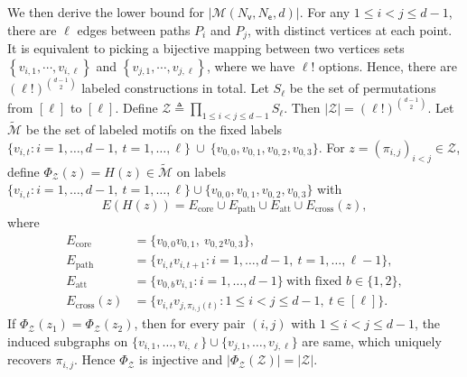 \documentclass[letterpaper,11pt]{article}
\theoremstyle{definition}
\newcommand{\maM}{\mathcal{M}}
\newcommand{\maZ}{\mathcal{Z}}
\newcommand{\nbr}[1]{{\sf\color{red}[#1]}}
\newcommand{\sth}[1]{\left\{ #1 \right\}}
\newcommand{\calX}{{\mathcal{X}}}
\newcommand{\calY}{{\mathcal{Y}}}
\newcommand{\sfM}{{\mathsf{M}}}
\newcommand{\sfe}{{\mathsf{e}}}
\newcommand{\sfv}{{\mathsf{v}}}
\newcommand{\aut}{\mathsf{aut}}
\begin{document}


We then derive the lower bound for $|\maM(N_\sfv,N_\sfe,d)|$. For any $1\le i<j\le d-1$, there are $\ell$ edges between paths $P_i$ and $P_j$, with distinct vertices at each point. It is equivalent to picking a bijective mapping between two vertices sets $\sth{v_{i,1},\cdots, v_{i,\ell}}$ and $\sth{v_{j,1},\cdots, v_{j,\ell}}$, where we have $\ell!$ options. 
Hence, there are $(\ell !)^{\binom{d-1}{2}}$ labeled constructions in total. 
Let $S_{\ell}$ be the set of permutations from $[\ell]$ to $[\ell]$. Define $\mathcal{Z}\triangleq\prod_{1\le i<j\le d-1} S_{\ell}$. Then $|\maZ| =(\ell!)^{\binom{d-1}{2}}$.
Let $\widetilde{\mathcal{M}}$ be the set of labeled motifs on the fixed labels
\(
\{v_{i,t}: i=1,\dots,d-1,\ t=1,\dots,\ell\}\ \cup\ \{v_{0,0},v_{0,1},v_{0,2},v_{0,3}\}.
\)
For $z=(\pi_{i,j})_{i<j}\in\mathcal Z$, define $\Phi_{\mathcal Z}(z)=H(z)\in\widetilde{\mathcal M}$ on labels
$\{v_{i,t}: i=1,\dots,d-1,\ t=1,\dots,\ell\}\cup\{v_{0,0},v_{0,1},v_{0,2},v_{0,3}\}$ with
\[
E(H(z))=E_{\mathrm{core}}\cup E_{\mathrm{path}}\cup E_{\mathrm{att}}\cup E_{\mathrm{cross}}(z),
\]
where
\begin{align*}
    E_{\mathrm{core}}&=\{v_{0,0}v_{0,1},\ v_{0,2}v_{0,3}\},\\
E_{\mathrm{path}}&=\{v_{i,t}v_{i,t+1}: i=1,\dots,d-1,\ t=1,\dots,\ell-1\},\\
E_{\mathrm{att}}&=\{v_{0,b}v_{i,1}: i=1,\dots,d-1\}\ \text{with fixed }b\in\{1,2\},\\
E_{\mathrm{cross}}(z)&=\{v_{i,t}v_{j,\pi_{i,j}(t)}: 1\le i<j\le d-1,\ t\in[\ell]\}.
\end{align*}
If $\Phi_{\mathcal{Z}}(z_1)=\Phi_{\mathcal{Z}}(z_2)$, then for every pair $(i,j)$ with $1\le i<j\le d-1$, the induced
subgraphs on $\{v_{i,1},\dots,v_{i,\ell}\}\cup\{v_{j,1},\dots,v_{j,\ell}\}$ are  same, which uniquely recovers $\pi_{i,j}$. Hence $\Phi_{\mathcal{Z}}$ is injective and
$|\Phi_{\mathcal{Z}}(\mathcal{Z})|=|\mathcal{Z}|$.
\end{document}
